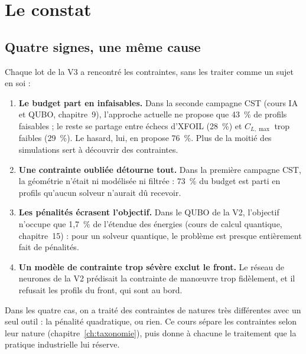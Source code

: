 \chapter{Le constat}\label{ch:constat}

\section{Quatre signes, une même cause}
Chaque lot de la V3 a rencontré les contraintes, sans les traiter comme un sujet en soi :
\begin{enumerate}
\item \textbf{Le budget part en infaisables.} Dans la seconde campagne CST (cours IA et QUBO, chapitre~9), l'approche actuelle ne propose que 43~\% de profils faisables ; le reste se partage entre échecs d'XFOIL (28~\%) et $C_{L,\max}$ trop faibles (29~\%). Le hasard, lui, en propose 76~\%. Plus de la moitié des simulations sert à découvrir des contraintes.
\item \textbf{Une contrainte oubliée détourne tout.} Dans la première campagne CST, la géométrie n'était ni modélisée ni filtrée : 73~\% du budget est parti en profils qu'aucun solveur n'aurait dû recevoir.
\item \textbf{Les pénalités écrasent l'objectif.} Dans le QUBO de la V2, l'objectif n'occupe que 1,7~\% de l'étendue des énergies (cours de calcul quantique, chapitre~15) : pour un solveur quantique, le problème est presque entièrement fait de pénalités.
\item \textbf{Un modèle de contrainte trop sévère exclut le front.} Le réseau de neurones de la V2 prédisait la contrainte de manœuvre trop fidèlement, et il refusait les profils du front, qui sont au bord.
\end{enumerate}
Dans les quatre cas, on a traité des contraintes de natures très différentes avec un seul outil : la pénalité quadratique, ou rien. Ce cours sépare les contraintes selon leur nature (chapitre~\ref{ch:taxonomie}), puis donne à chacune le traitement que la pratique industrielle lui réserve.

